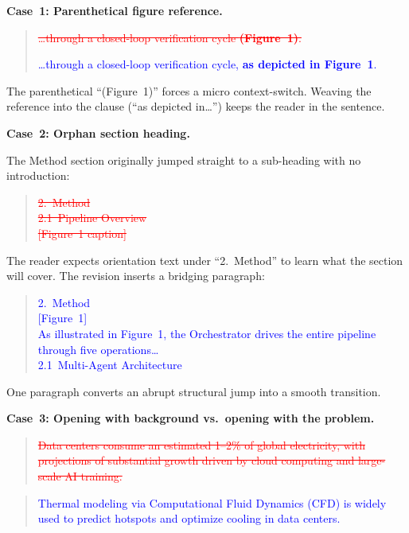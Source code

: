 \documentclass[journal]{IEEEtran}
\newcommand{\revdel}[1]{\textcolor{red}{\sout{#1}}}
\newcommand{\revadd}[1]{\textcolor{blue}{#1}}
\begin{document}
\textbf{Case~1: Parenthetical figure reference.}

\begin{quote}
\revdel{\ldots through a closed-loop verification cycle \textbf{(Figure~1)}.}

\revadd{\ldots through a closed-loop verification cycle, \textbf{as depicted in Figure~1}.}
\end{quote}

\noindent The parenthetical ``(Figure~1)'' forces a micro context-switch. Weaving the reference into the clause (``as depicted in\ldots'') keeps the reader in the sentence.

\medskip

\textbf{Case~2: Orphan section heading.}

The Method section originally jumped straight to a sub-heading with no introduction:

\begin{quote}
\revdel{2.\ Method \\ 2.1\ Pipeline Overview \\ {[}Figure~1 caption{]}}
\end{quote}

\noindent The reader expects orientation text under ``2.\ Method'' to learn what the section will cover. The revision inserts a bridging paragraph:

\begin{quote}
\revadd{2.\ Method \\ {[}Figure~1{]} \\ As illustrated in Figure~1, the Orchestrator drives the entire pipeline through five operations\ldots \\ 2.1\ Multi-Agent Architecture}
\end{quote}

\noindent One paragraph converts an abrupt structural jump into a smooth transition.

\medskip

\textbf{Case~3: Opening with background vs.\ opening with the problem.}

\begin{quote}
\revdel{Data centers consume an estimated 1--2\% of global electricity, with projections of substantial growth driven by cloud computing and large-scale AI training.}
\end{quote}

\begin{quote}
\revadd{Thermal modeling via Computational Fluid Dynamics (CFD) is widely used to predict hotspots and optimize cooling in data centers.}
\end{quote}
\end{document}

